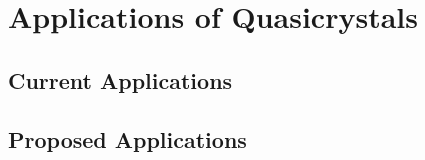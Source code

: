 \section{Applications of Quasicrystals}

\subsection{Current Applications}

\subsection{Proposed Applications}
